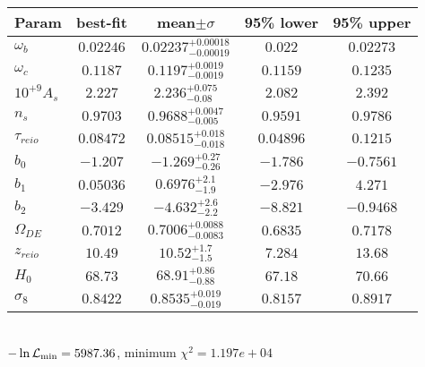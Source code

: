 \begin{tabular}{|l|c|c|c|c|} 
 \hline 
Param & best-fit & mean$\pm\sigma$ & 95\% lower & 95\% upper \\ \hline 
$\omega_b$ &$0.02246$ & $0.02237_{-0.00019}^{+0.00018}$ & $0.022$ & $0.02273$ \\ 
$\omega_c$ &$0.1187$ & $0.1197_{-0.0019}^{+0.0019}$ & $0.1159$ & $0.1235$ \\ 
$10^{+9}A_{s }$ &$2.227$ & $2.236_{-0.08}^{+0.075}$ & $2.082$ & $2.392$ \\ 
$n_{s }$ &$0.9703$ & $0.9688_{-0.005}^{+0.0047}$ & $0.9591$ & $0.9786$ \\ 
$\tau_{reio }$ &$0.08472$ & $0.08515_{-0.018}^{+0.018}$ & $0.04896$ & $0.1215$ \\ 
$b_{0 }$ &$-1.207$ & $-1.269_{-0.26}^{+0.27}$ & $-1.786$ & $-0.7561$ \\ 
$b_{1 }$ &$0.05036$ & $0.6976_{-1.9}^{+2.1}$ & $-2.976$ & $4.271$ \\ 
$b_{2 }$ &$-3.429$ & $-4.632_{-2.2}^{+2.6}$ & $-8.821$ & $-0.9468$ \\ 
$\Omega_{DE}$ &$0.7012$ & $0.7006_{-0.0083}^{+0.0088}$ & $0.6835$ & $0.7178$ \\ 
$z_{reio }$ &$10.49$ & $10.52_{-1.5}^{+1.7}$ & $7.284$ & $13.68$ \\ 
$H_{0 }$ &$68.73$ & $68.91_{-0.88}^{+0.86}$ & $67.18$ & $70.66$ \\ 
$\sigma_8$ &$0.8422$ & $0.8535_{-0.019}^{+0.019}$ & $0.8157$ & $0.8917$ \\ 
\hline 
 \end{tabular} \\ 
$-\ln{\cal L}_\mathrm{min} =5987.36$, minimum $\chi^2=1.197e+04$ \\ 
